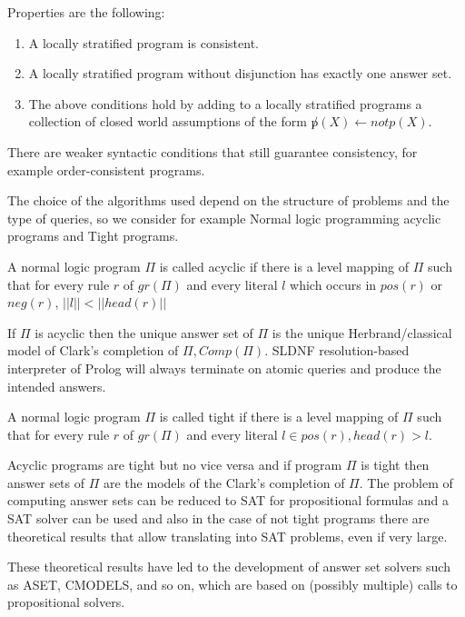Properties are the following:
\begin{enumerate}
   \item A locally stratified program is consistent.
   \item A locally stratified program without disjunction has exactly one answer set.
   \item The above conditions hold by adding to a locally stratified programs a collection
	 of closed world assumptions of the form $\not p(X) \gets not p(X)$.
\end{enumerate}
There are weaker syntactic conditions that still guarantee consistency, 
for example order-consistent programs.

The choice of the algorithms used depend on the structure of problems and the type of
queries, so we consider for example Normal logic programming acyclic programs 
and Tight programs.
\begin{defi}
A normal logic program $\Pi$ is called acyclic if there is a level mapping of $\Pi$ such that
for every rule $r$ of $gr(\Pi)$ and every literal $l$ which occurs in $pos(r)$ or $neg(r)$,
$||l || < ||head(r)||$
\end{defi}
If $\Pi$ is acyclic then the unique answer set of $\Pi$ is the unique Herbrand/classical model
of Clark’s completion of $\Pi, Comp(\Pi)$.\newline
SLDNF resolution-based interpreter of Prolog will always terminate on atomic queries
and produce the intended answers.

\begin{defi}
A normal logic program $\Pi$ is called tight if there is a level mapping of $\Pi$ such that
for every rule $r$ of $gr(\Pi)$ and every literal $l \in pos(r), head(r) > l$.
\end{defi}
Acyclic programs are tight but no vice versa and if program $\Pi$ is tight then answer sets
of $\Pi$ are the models of the Clark’s completion of $\Pi$.\newline
The problem of computing answer sets can be reduced to SAT for propositional formulas
and a SAT solver can be used and also in the case of not tight programs there are 
theoretical results that allow translating into SAT problems, even if very large.

These theoretical results have led to the development of answer set solvers such as ASET,
CMODELS, and so on, which are based on (possibly multiple) calls to propositional solvers.

